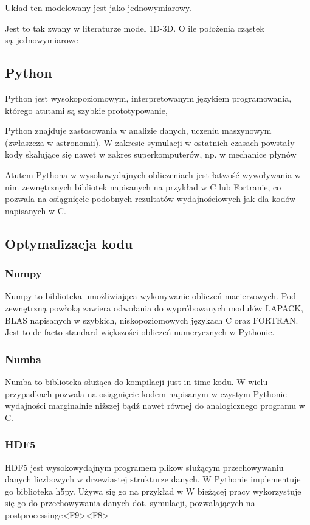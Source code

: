 Układ ten modelowany jest jako jednowymiarowy.

Jest to tak zwany w literaturze model 1D-3D. O ile położenia cząstek są jednowymiarowe


\subsection{Python}
Python jest wysokopoziomowym, interpretowanym językiem programowania, którego atutami są szybkie prototypowanie,

Python znajduje zastosowania w analizie danych, uczeniu maszynowym (zwłaszcza w astronomii). W zakresie symulacji
w ostatnich czasach powstały kody skalujące się nawet w zakres superkomputerów, np. w mechanice płynów %

Atutem Pythona w wysokowydajnych obliczeniach jest łatwość wywoływania w nim zewnętrznych bibliotek napisanych
na przykład w C lub Fortranie, co pozwala na osiągnięcie podobnych rezultatów wydajnościowych jak dla kodów
napisanych w C.

\subsection{Optymalizacja kodu}

\subsubsection{Numpy}
Numpy to biblioteka umożliwiająca wykonywanie obliczeń macierzowych. Pod zewnętrzną powłoką zawiera odwołania do
wypróbowanych modułów LAPACK, BLAS %
napisanych w szybkich, niskopoziomowych językach C oraz FORTRAN. Jest to de facto standard większości obliczeń
numerycznych w Pythonie.
\subsubsection{Numba}
Numba to biblioteka służąca do kompilacji just-in-time kodu. %
W wielu przypadkach %
pozwala na osiągnięcie kodem napisanym w czystym Pythonie wydajności marginalnie niższej bądź nawet równej do analogicznego
programu w C. %
\subsubsection{HDF5}
HDF5 jest wysokowydajnym programem plikow służącym przechowywaniu danych liczbowych w drzewiastej strukturze danych.
W Pythonie implementuje go biblioteka h5py.
Używa się go na przykład w %
W bieżącej pracy  wykorzystuje się go do przechowywania danych dot. symulacji, pozwalających na postprocessinge<F9><F8>

